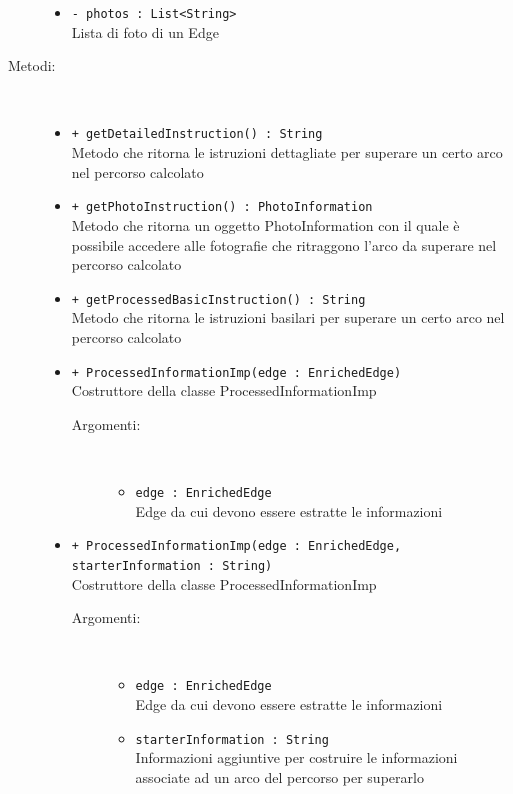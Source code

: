 \documentclass[../DefinizioneDiProdotto.tex]{subfiles}
\begin{document}
\begin{description}
\begin{itemize}
\item \texttt{- photos : List<String>}\\
Lista di foto di un Edge

\end{itemize}
\item[Metodi:] \
\begin{itemize}
\item \texttt{+ getDetailedInstruction() : String}\\
Metodo che ritorna le istruzioni dettagliate per superare un certo arco nel percorso calcolato
 \item \texttt{+ getPhotoInstruction() : PhotoInformation}\\
Metodo che ritorna un oggetto PhotoInformation con il quale è possibile accedere alle fotografie che ritraggono l'arco da superare nel percorso calcolato
 \item \texttt{+ getProcessedBasicInstruction() : String}\\
Metodo che ritorna le istruzioni basilari per superare un certo arco nel percorso calcolato
 \item \texttt{+ ProcessedInformationImp(edge : EnrichedEdge)}\\
Costruttore della classe ProcessedInformationImp
 \begin{description}
\item[Argomenti:] \
\begin{itemize}
\item \texttt{edge : EnrichedEdge}\\
Edge da cui devono essere estratte le informazioni\end{itemize}
\end{description}
\item \texttt{+ ProcessedInformationImp(edge : EnrichedEdge, starterInformation : String)}\\
Costruttore della classe ProcessedInformationImp
 \begin{description}
\item[Argomenti:] \
\begin{itemize}
\item \texttt{edge : EnrichedEdge}\\
Edge da cui devono essere estratte le informazioni\item \texttt{starterInformation : String}\\
Informazioni aggiuntive per costruire le informazioni associate ad un arco del percorso per superarlo\end{itemize}
\end{description}
\end{itemize}
\end{description}
\end{document}

